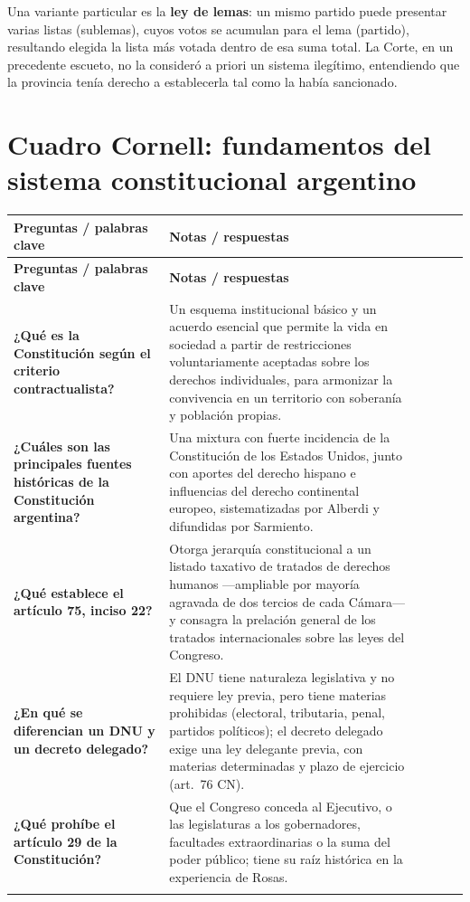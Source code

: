 \documentclass[12pt,oneside]{book}
\newcommand{\cornellhead}{%
    \toprule
    \textbf{Preguntas / palabras clave} & \textbf{Notas / respuestas} \\
    \midrule}
\newcommand{\cornellsep}{\\ \addlinespace \cmidrule[0.2pt]{1-2} \addlinespace}
\begin{document}
Una variante particular es la \textbf{ley de lemas}: un mismo partido puede presentar varias listas (sublemas), cuyos votos se acumulan para el lema (partido), resultando elegida la lista más votada dentro de esa suma total. La Corte, en un precedente escueto, no la consideró a priori un sistema ilegítimo, entendiendo que la provincia tenía derecho a establecerla tal como la había sancionado.

\section{Cuadro Cornell: fundamentos del sistema constitucional argentino}

\begin{longtable}{Q{0.28\textwidth}Q{\textwidth\relax}}
\cornellhead
\endfirsthead
\cornellhead
\endhead

\textbf{¿Qué es la Constitución según el criterio contractualista?} &
Un esquema institucional básico y un acuerdo esencial que permite la vida en sociedad a partir de restricciones voluntariamente aceptadas sobre los derechos individuales, para armonizar la convivencia en un territorio con soberanía y población propias.
\cornellsep

\textbf{¿Cuáles son las principales fuentes históricas de la Constitución argentina?} &
Una mixtura con fuerte incidencia de la Constitución de los Estados Unidos, junto con aportes del derecho hispano e influencias del derecho continental europeo, sistematizadas por Alberdi y difundidas por Sarmiento.
\cornellsep

\textbf{¿Qué establece el artículo 75, inciso 22?} &
Otorga jerarquía constitucional a un listado taxativo de tratados de derechos humanos ---ampliable por mayoría agravada de dos tercios de cada Cámara--- y consagra la prelación general de los tratados internacionales sobre las leyes del Congreso.
\cornellsep

\textbf{¿En qué se diferencian un DNU y un decreto delegado?} &
El DNU tiene naturaleza legislativa y no requiere ley previa, pero tiene materias prohibidas (electoral, tributaria, penal, partidos políticos); el decreto delegado exige una ley delegante previa, con materias determinadas y plazo de ejercicio (art.\ 76 CN).
\cornellsep

\textbf{¿Qué prohíbe el artículo 29 de la Constitución?} &
Que el Congreso conceda al Ejecutivo, o las legislaturas a los gobernadores, facultades extraordinarias o la suma del poder público; tiene su raíz histórica en la experiencia de Rosas.
\cornellsep


\end{longtable}
\end{document}
